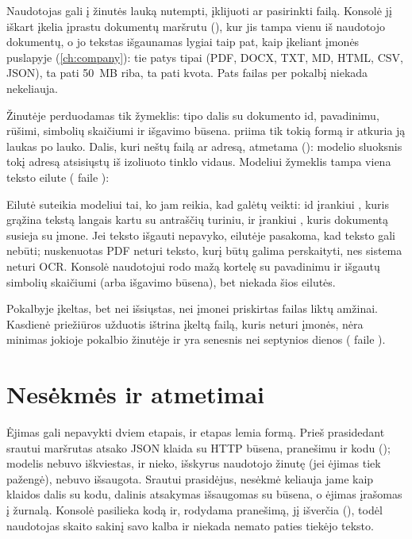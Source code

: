 Naudotojas gali į žinutės lauką nutempti, įklijuoti ar pasirinkti failą. Konsolė jį iškart įkelia
įprastu dokumentų maršrutu (), kur jis tampa vienu iš naudotojo
dokumentų, o jo tekstas išgaunamas lygiai taip pat, kaip įkeliant įmonės puslapyje
(\cref{ch:company}): tie patys tipai (PDF, DOCX, TXT, MD, HTML, CSV, JSON), ta pati 50~MB riba,
ta pati kvota. Pats failas per pokalbį niekada nekeliauja.

Žinutėje perduodamas tik žymeklis:  tipo dalis su dokumento id, pavadinimu,
rūšimi, simbolių skaičiumi ir išgavimo būsena.  priima tik tokią formą ir
atkuria ją laukas po lauko. Dalis, kuri neštų failą ar adresą, atmetama ():
modelio sluoksnis tokį adresą atsisiųstų iš izoliuoto tinklo vidaus. Modeliui žymeklis tampa
viena teksto eilute ( faile ):

\begin{codeblock}
\end{codeblock}

Eilutė suteikia modeliui tai, ko jam reikia, kad galėtų veikti: id įrankiui , kuris grąžina
tekstą langais kartu su antraščių turiniu, ir įrankiui , kuris dokumentą
susieja su įmone. Jei teksto išgauti nepavyko, eilutėje pasakoma, kad teksto gali nebūti;
nuskenuotas PDF neturi teksto, kurį būtų galima perskaityti, nes sistema neturi OCR. Konsolė
naudotojui rodo mažą kortelę su pavadinimu ir išgautų simbolių skaičiumi (arba išgavimo būsena),
bet niekada šios eilutės.

Pokalbyje įkeltas, bet nei išsiųstas, nei įmonei priskirtas failas liktų amžinai. Kasdienė
priežiūros užduotis ištrina įkeltą failą, kuris neturi įmonės, nėra minimas jokioje pokalbio
žinutėje ir yra senesnis nei septynios dienos ( faile
).


\section{Nesėkmės ir atmetimai}\label{sec:chat:failure}

Ėjimas gali nepavykti dviem etapais, ir etapas lemia formą. Prieš prasidedant srautui maršrutas
atsako JSON klaida su HTTP būsena, pranešimu ir kodu (); modelis nebuvo
iškviestas, ir nieko, išskyrus naudotojo žinutę (jei ėjimas tiek pažengė), nebuvo išsaugota.
Srautui prasidėjus, nesėkmė keliauja jame kaip klaidos dalis su kodu, dalinis atsakymas išsaugomas
su būsena, o ėjimas įrašomas į žurnalą. Konsolė pasilieka kodą ir, rodydama pranešimą, jį išverčia
(), todėl naudotojas skaito sakinį savo kalba ir niekada nemato
paties tiekėjo teksto.

